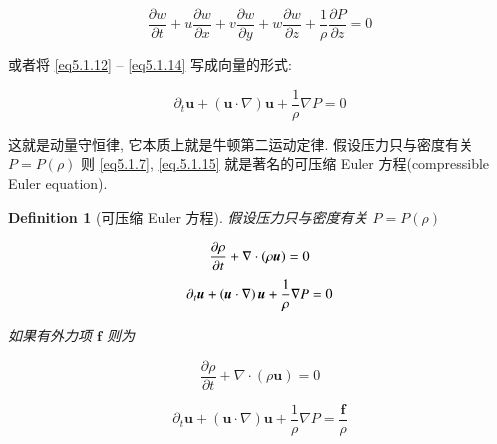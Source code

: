 \documentclass[11pt]{article}
\newtheorem{definition}{Definition}[subsection]
\begin{document}
\begin{equation}
\frac{{\partial w}}{{\partial t}} + u\frac{{\partial w}}{{\partial x}} + v\frac{{\partial w}}{{\partial y}} + w\frac{{\partial w}}{{\partial z}} + \frac{1}{\rho }\frac{{\partial P}}{{\partial z}} = 0
\label{eq5.1.14}
\end{equation}

或者将 \ref{eq5.1.12} -- \ref{eq5.1.14} 写成向量的形式:

\begin{equation}
{\partial _t}\boldsymbol{u} + \left( {\boldsymbol{u} \cdot \nabla } \right)\boldsymbol{u} + \frac{1}{\rho }\nabla P = 0
\label{eq5.1.15}
\end{equation}

这就是动量守恒律, 它本质上就是牛顿第二运动定律. 假设压力只与密度有关 $ P = P\left(\rho \right) $ 则 \ref{eq5.1.7}, \ref{eq.5.1.15} 就是著名的可压缩 Euler 方程(compressible Euler equation).

\begin{definition}[\kaishu 可压缩 Euler 方程]
	假设压力只与密度有关 $P = P\left( \rho  \right)$
	
	\begin{equation}
	\frac{{\partial \rho }}{{\partial t}}   + \nabla  \cdot \left( {\rho \boldsymbol{u}} \right)  = 0
	\notag 
	\end{equation}
	\vspace{-0.5cm}
	\begin{equation}
	{\partial _t}\boldsymbol{u} +  \left( {\boldsymbol{u} \cdot \nabla } \right)\boldsymbol{u} + \frac{1}{\rho }\nabla P  = 0
	\notag 
	\end{equation}
	
	如果有外力项 $ \boldsymbol{f} $ 则为
	
	\begin{equation}
	\frac{{\partial \rho }}{{\partial t}}   + \nabla  \cdot \left( {\rho \boldsymbol{u}} \right)  = 0
	\label{eq5.1.16}
	\end{equation}
	
	\vspace{-1cm}
	
	\begin{equation}
	{\partial _t}\boldsymbol{u} + \left( {\boldsymbol{u} \cdot \nabla } \right)\boldsymbol{u} + \frac{1}{\rho }\nabla P = \frac{\boldsymbol{f}}{\rho }
	\label{eq5.1.17}
	\end{equation}
	
\end{definition}
\end{document}
